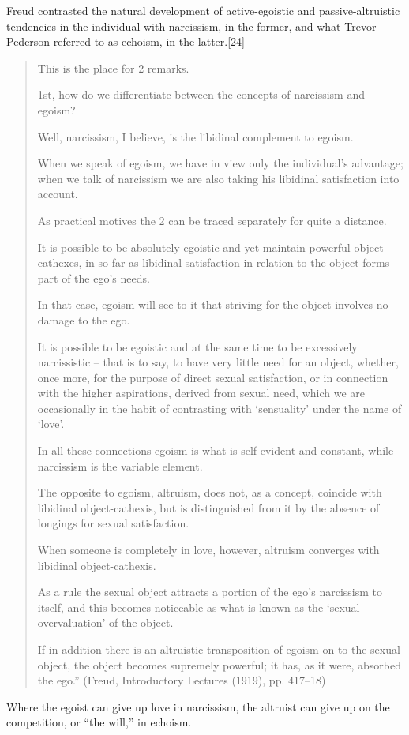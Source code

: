 \documentclass[oneside]{book}
\numberwithin{equation}{section}
\begin{document}
%
Freud contrasted the natural development of active-egoistic and passive-altruistic tendencies in the individual with narcissism, in the former, and what Trevor Pederson referred to as echoism, in the latter.[24]
\begin{quotation}
    This is the place for 2 remarks.
    
    1st, how do we differentiate between the concepts of narcissism and egoism?
    
    Well, narcissism, I believe, is the libidinal complement to egoism.
    
    When we speak of egoism, we have in view only the individual's advantage; when we talk of narcissism we are also taking his libidinal satisfaction into account.
    
    As practical motives the 2 can be traced separately for quite a distance.
    
    It is possible to be absolutely egoistic and yet maintain powerful object-cathexes, in so far as libidinal satisfaction in relation to the object forms part of the ego's needs.
    
    In that case, egoism will see to it that striving for the object involves no damage to the ego.
    
    It is possible to be egoistic and at the same time to be excessively narcissistic -- that is to say, to have very little need for an object, whether, once more, for the purpose of direct sexual satisfaction, or in connection with the higher aspirations, derived from sexual need, which we are occasionally in the habit of contrasting with `sensuality' under the name of `love'.
    
    In all these connections egoism is what is self-evident and constant, while narcissism is the variable element.
    
    The opposite to egoism, altruism, does not, as a concept, coincide with libidinal object-cathexis, but is distinguished from it by the absence of longings for sexual satisfaction.
    
    When someone is completely in love, however, altruism converges with libidinal object-cathexis.
    
    As a rule the sexual object attracts a portion of the ego's narcissism to itself, and this becomes noticeable as what is known as the `sexual overvaluation' of the object.
    
    If in addition there is an altruistic transposition of egoism on to the sexual object, the object becomes supremely powerful; it has, as it were, absorbed the ego.'' (Freud, Introductory Lectures (1919), pp. 417--18)
\end{quotation}
Where the egoist can give up love in narcissism, the altruist can give up on the competition, or ``the will,'' in echoism.
\end{document}

